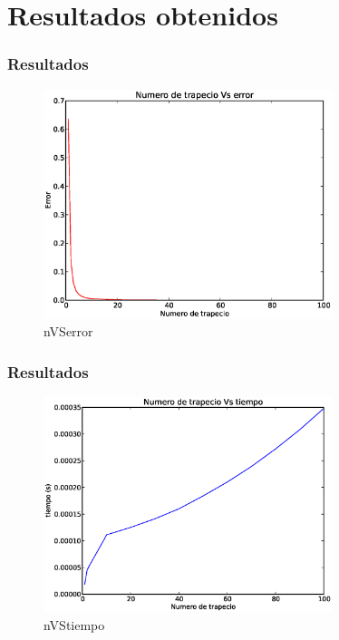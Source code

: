 \documentclass{beamer}
\begin{document}
\section{Resultados obtenidos}
\begin{frame}
  \frametitle{Resultados}
  \begin{figure}[!th]
    \begin{center}
      \includegraphics[width=0.75\textwidth]{img/Plot_nVSerror.eps}
      \caption{nVSerror}
      \label{fig:1}
    \end{center}
  \end{figure}
\end{frame}

\begin{frame}
  \frametitle{Resultados}
  \begin{figure}[!th]
    \begin{center}
      \includegraphics[width=0.75\textwidth]{img/Plot_nVStime.eps}
      \caption{nVStiempo}
      \label{fig:2}
    \end{center}
  \end{figure}
\end{frame}
\end{document}

